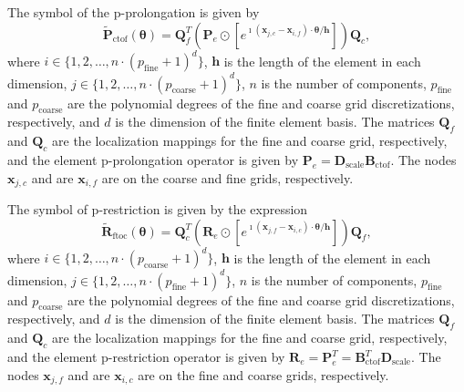\documentclass[review]{siamart190516}
\begin{document}
\begin{definition}\label{def:prolongation_symbol}
The symbol of the p-prolongation is given by
\begin{equation}
\tilde{\mathbf{P}}_{\text{ctof}} \left( \boldsymbol{\theta} \right) = \mathbf{Q}_f^T \left( \mathbf{P}_e \odot \left[ e^{\imath \left( \mathbf{x}_{j, c} - \mathbf{x}_{i, f} \right) \cdot \boldsymbol{\theta} / \mathbf{h}} \right] \right) \mathbf{Q}_c,
\end{equation}
where $i \in \lbrace 1, 2, \dots, n \cdot \left( p_{\text{fine}} + 1 \right)^d \rbrace$, $\mathbf{h}$ is the length of the element in each dimension, $j \in \lbrace 1, 2, \dots, n \cdot \left( p_{\text{coarse}} + 1 \right)^d \rbrace$, $n$ is the number of components, $p_{\text{fine}}$ and $p_{\text{coarse}}$ are the polynomial degrees of the fine and coarse grid discretizations, respectively, and $d$ is the dimension of the finite element basis.
The matrices $\mathbf{Q}_f$ and $\mathbf{Q}_c$ are the localization mappings for the fine and coarse grid, respectively, and the element p-prolongation operator is given by $\mathbf{P}_e = \mathbf{D}_{\text{scale}} \mathbf{B}_{\text{ctof}}$.
The nodes $\mathbf{x}_{j, c}$ and are $\mathbf{x}_{i, f}$ are on the coarse and fine grids, respectively.
\end{definition}

\begin{definition}\label{def:restriction_symbol}
The symbol of p-restriction is given by the expression
\begin{equation}
\tilde{\mathbf{R}}_{\text{ftoc}} \left( \boldsymbol{\theta} \right) = \mathbf{Q}_c^T \left( \mathbf{R}_e \odot \left[ e^{\imath \left( \mathbf{x}_{j, f} - \mathbf{x}_{i, c} \right) \cdot \boldsymbol{\theta} / \mathbf{h}} \right] \right) \mathbf{Q}_f,
\end{equation}
where $i \in \lbrace 1, 2, \dots, n \cdot \left( p_{\text{coarse}} + 1 \right)^d \rbrace$, $\mathbf{h}$ is the length of the element in each dimension, $j \in \lbrace 1, 2, \dots, n \cdot \left( p_{\text{fine}} + 1 \right)^d \rbrace$, $n$ is the number of components, $p_{\text{fine}}$ and $p_{\text{coarse}}$ are the polynomial degrees of the fine and coarse grid discretizations, respectively, and $d$ is the dimension of the finite element basis.
The matrices $\mathbf{Q}_f$ and $\mathbf{Q}_c$ are the localization mappings for the fine and coarse grid, respectively, and the element p-restriction operator is given by $\mathbf{R}_e = \mathbf{P}_e^T = \mathbf{B}_{\text{ctof}}^T \mathbf{D}_{\text{scale}}$.
The nodes $\mathbf{x}_{j, f}$ and are $\mathbf{x}_{i, c}$ are on the fine and coarse grids, respectively.
\end{definition}
\end{document}
